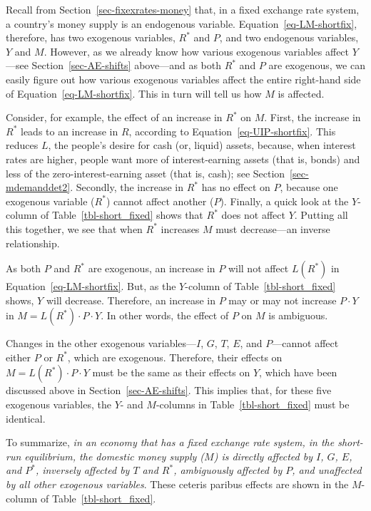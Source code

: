 \documentclass[
  letterpaper,
]{book}
\theoremstyle{plain}
\theoremstyle{remark}
\begin{document}
Recall from Section~\ref{sec-fixexrates-money} that, in a fixed exchange
rate system, a country's money supply is an endogenous variable.
Equation~\ref{eq-LM-shortfix}, therefore, has two exogenous variables,
\(R^*\) and \(P\), and two endogenous variables, \(Y\) and \(M\).
However, as we already know how various exogenous variables affect
\(Y\)---see Section~\ref{sec-AE-shifts} above---and as both \(R^*\) and
\(P\) are exogenous, we can easily figure out how various exogenous
variables affect the entire right-hand side of
Equation~\ref{eq-LM-shortfix}. This in turn will tell us how \(M\) is
affected.

Consider, for example, the effect of an increase in \(R^*\) on \(M\).
First, the increase in \(R^*\) leads to an increase in \(R\), according
to Equation~\ref{eq-UIP-shortfix}. This reduces \(L\), the people's
desire for cash (or, liquid) assets, because, when interest rates are
higher, people want more of interest-earning assets (that is, bonds) and
less of the zero-interest-earning asset (that is, cash); see
Section~\ref{sec-mdemanddet2}. Secondly, the increase in \(R^*\) has no
effect on \(P\), because one exogenous variable (\(R^*\)) cannot affect
another (\(P\)). Finally, a quick look at the \(Y\)-column of
Table~\ref{tbl-short_fixed} shows that \(R^*\) does not affect \(Y\).
Putting all this together, we see that when \(R^*\) increases \(M\) must
decrease---an inverse relationship.

As both \(P\) and \(R^*\) are exogenous, an increase in \(P\) will not
affect \(L(R^*)\) in Equation~\ref{eq-LM-shortfix}. But, as the
\(Y\)-column of Table~\ref{tbl-short_fixed} shows, \(Y\) will decrease.
Therefore, an increase in \(P\) may or may not increase \(P\cdot Y\) in
\(M=L(R^*)\cdot P\cdot Y\). In other words, the effect of \(P\) on \(M\)
is ambiguous.

Changes in the other exogenous variables---\(I\), \(G\), \(T\), \(E\),
and \(P\)---cannot affect either \(P\) or \(R^*\), which are exogenous.
Therefore, their effects on \(M=L(R^*)\cdot P\cdot Y\) must be the same
as their effects on \(Y\), which have been discussed above in
Section~\ref{sec-AE-shifts}. This implies that, for these five exogenous
variables, the \(Y\)- and \(M\)-columns in Table~\ref{tbl-short_fixed}
must be identical.

To summarize, \emph{in an economy that has a fixed exchange rate system,
in the short-run equilibrium, the domestic money supply (\(M\)) is
directly affected by \(I\), \(G\), \(E\), and \(P^*\), inversely
affected by \(T\) and \(R^*\), ambiguously affected by \(P\), and
unaffected by all other exogenous variables}. These ceteris paribus
effects are shown in the \(M\)-column of Table~\ref{tbl-short_fixed}.
\end{document}
